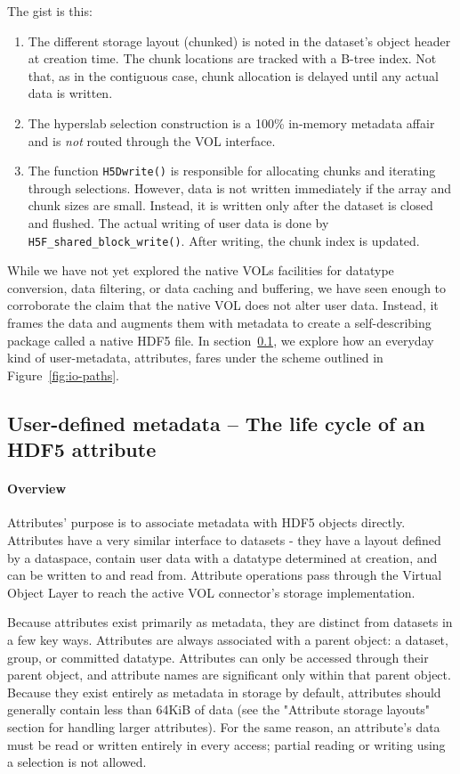 The gist is this:
\begin{enumerate}
    \item The different storage layout (chunked) is noted in the dataset's object header at creation time. The chunk locations are tracked with a B-tree index. Not that, as in the contiguous case, chunk allocation is delayed until any actual data is written.
    \item The hyperslab selection construction is a 100\% in-memory metadata affair and is \textit{not} routed through the VOL interface.
    \item The function \texttt{H5Dwrite()} is responsible for allocating chunks and iterating through selections. However, data is not written immediately if the array and chunk sizes are small. Instead, it is written only after the dataset is closed and flushed. The actual writing of user data is done by \texttt{H5F\_shared\_block\_write()}. After writing, the chunk index is updated.
\end{enumerate}

While we have not yet explored the native VOLs facilities for datatype conversion, data filtering, or data caching and buffering, we have seen enough to corroborate the claim that the native VOL does not alter user data. Instead, it frames the data and augments them with metadata to create a self-describing package called a native HDF5 file. In section~\ref{sec:user-metadata}, we explore how an everyday kind of user-metadata, attributes, fares under the scheme outlined in Figure~\ref{fig:io-paths}.

\subsection{User-defined metadata -- The life cycle of an HDF5 attribute}\label{sec:user-metadata}

\paragraph{Overview} Attributes' purpose is to associate metadata with HDF5 objects directly. Attributes have a very similar interface to datasets - they have a layout defined by a dataspace, contain user data with a datatype determined at creation, and can be written to and read from. Attribute operations pass through the Virtual Object Layer to reach the active VOL connector's storage implementation.

Because attributes exist primarily as metadata, they are distinct from datasets in a few key ways. Attributes are always associated with a parent object: a dataset, group, or committed datatype. Attributes can only be accessed through their parent object, and attribute names are significant only within that parent object. Because they exist entirely as metadata in storage by default, attributes should generally contain less than 64KiB of data (see the "Attribute storage layouts" section for handling larger attributes). For the same reason, an attribute's data must be read or written entirely in every access; partial reading or writing using a selection is not allowed.


